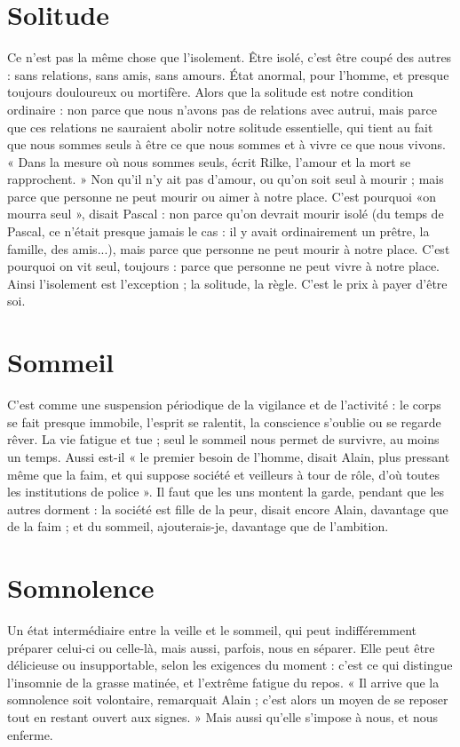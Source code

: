 \section{Solitude}
Ce n’est pas la même chose que l’isolement. Être isolé, c’est être
coupé des autres : sans relations, sans amis, sans amours. État
anormal, pour l’homme, et presque toujours douloureux ou mortifère. Alors
que la solitude est notre condition ordinaire : non parce que nous n'avons pas
de relations avec autrui, mais parce que ces relations ne sauraient abolir notre
solitude essentielle, qui tient au fait que nous sommes seuls à être ce que nous
sommes et à vivre ce que nous vivons. « Dans la mesure où nous sommes seuls,
écrit Rilke, l'amour et la mort se rapprochent. » Non qu’il n’y ait pas d'amour,
ou qu’on soit seul à mourir ; mais parce que personne ne peut mourir ou aimer
à notre place. C’est pourquoi «on mourra seul », disait Pascal : non parce
qu’on devrait mourir isolé (du temps de Pascal, ce n’était presque jamais le cas :
il y avait ordinairement un prêtre, la famille, des amis...), mais parce que personne
ne peut mourir à notre place. C’est pourquoi on vit seul, toujours : parce
que personne ne peut vivre à notre place. Ainsi l'isolement est l'exception ; la
solitude, la règle. C’est le prix à payer d’être soi.

\section{Sommeil}
C’est comme une suspension périodique de la vigilance et de
l’activité : le corps se fait presque immobile, l'esprit se ralentit, la
conscience s’oublie ou se regarde rêver. La vie fatigue et tue ; seul le sommeil
nous permet de survivre, au moins un temps. Aussi est-il « le premier besoin de
l’homme, disait Alain, plus pressant même que la faim, et qui suppose société
et veilleurs à tour de rôle, d’où toutes les institutions de police ». Il faut que les
uns montent la garde, pendant que les autres dorment : la société est fille de la
peur, disait encore Alain, davantage que de la faim ; et du sommeil, ajouterais-je,
davantage que de l’ambition.

\section{Somnolence}
Un état intermédiaire entre la veille et le sommeil, qui peut
indifféremment préparer celui-ci ou celle-là, mais aussi,
parfois, nous en séparer. Elle peut être délicieuse ou insupportable, selon les
exigences du moment : c’est ce qui distingue l’insomnie de la grasse matinée, et
l'extrême fatigue du repos. « Il arrive que la somnolence soit volontaire, remarquait
Alain ; c’est alors un moyen de se reposer tout en restant ouvert aux
signes. » Mais aussi qu’elle s’impose à nous, et nous enferme.

